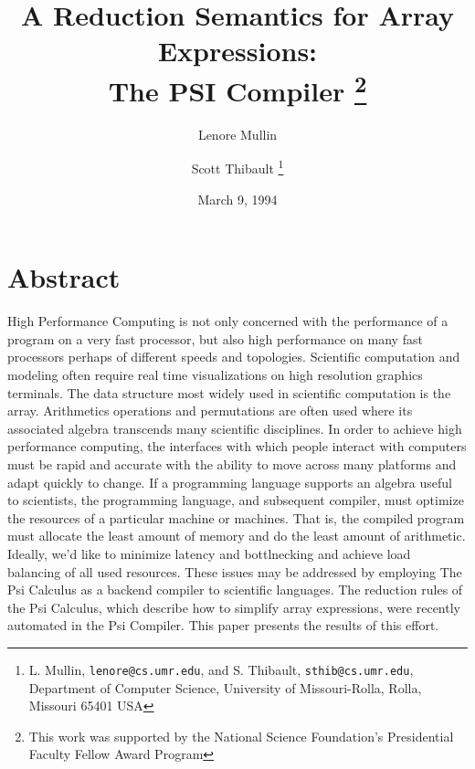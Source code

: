 \newcommand{\cat}{+\!\!\!\!+}
\newcommand{\take}{\,\bigtriangleup\,}
\newcommand{\drop}{\,\bigtriangledown\,}
\newcommand{\karate}{\!\widehat{\hbox to 10pt{}}\!}
\newcommand{\rshp}{\widehat{\rho}}
\newcommand{\one}{<\! 1\!>}
\newtheorem{definition}{Definition}
\newcommand{\Size}{\tau\,}
\newcommand{\Dim}{\delta\,}
\newcommand{\Ravel}{\,\mbox{\tt rav}\,}
\newcommand{\Reshape}{\,\widehat{\rho}\,}
\newcommand{\Reduce}{\,\mbox{\tt red}\,}
 
 
\title{A Reduction Semantics for Array Expressions:\\The PSI Compiler
\thanks{This work was supported by the National Science
          Foundation's Presidential Faculty Fellow Award Program}}
\author{Lenore Mullin \and Scott Thibault
\thanks{L. Mullin, {\tt lenore@cs.umr.edu}, 
and S. Thibault, {\tt sthib@cs.umr.edu}, Department of
     Computer Science, University of Missouri-Rolla, Rolla, Missouri 65401
USA}}
\date{March 9, 1994}


\maketitle
\section*{Abstract} 
High Performance Computing is not only concerned with the performance of
a program on a very fast processor, but also high performance
on many fast processors perhaps of different speeds and topologies. 
Scientific computation and modeling often require real time
visualizations on high resolution graphics terminals. The 
data structure most widely used in scientific computation is the
array. Arithmetics operations and permutations are often used
where its associated algebra transcends many
scientific disciplines. In order to achieve high performance
computing, the interfaces with which people interact with computers
must be rapid and accurate with the ability to move across
many platforms and adapt quickly to change. If a programming
language supports an algebra useful to scientists, the programming
language, and subsequent compiler, must optimize the resources of
a particular machine or machines. That is, the compiled
program must allocate the least amount of memory and do the least
amount of arithmetic. Ideally, we'd like to minimize
latency and bottlnecking and achieve load balancing of all used
resources. These issues may be addressed by employing
The Psi Calculus\cite{mul88,mdst92,mdst93,mdst94,tm93} 
as a backend compiler to scientific languages. 
The reduction rules of the Psi Calculus, which
describe how to simplify array expressions,
were recently automated in the Psi
Compiler\cite{tm93}. This paper presents the results of this effort.



